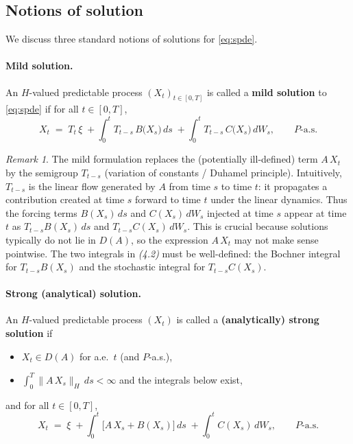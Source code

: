 \documentclass[11pt]{article}
\theoremstyle{definition}
\theoremstyle{remark}
\newtheorem{remark}{Remark}
\begin{document}
\subsection*{Notions of solution}

We discuss three standard notions of solutions for \eqref{eq:spde}.

\paragraph{Mild solution.}
An $H$-valued predictable process $(X_t)_{t\in[0,T]}$ is called a
\textbf{mild solution} to \eqref{eq:spde} if for all $t\in[0,T]$,
\begin{equation}\tag{4.2}
    X_t
    \;=\;
    T_t\,\xi
    \;+
    \int_0^t T_{t-s}\,B\bigl(X_s\bigr)\,ds
    \;+
    \int_0^t T_{t-s}\,C\bigl(X_s\bigr)\,dW_s,
    \qquad P\text{-a.s.}
\end{equation}

\begin{remark}
The mild formulation replaces the (potentially ill-defined) term $A\,X_t$ by
the semigroup $T_{t-s}$ (variation of constants / Duhamel principle).
Intuitively, $T_{t-s}$ is the linear flow generated by $A$ from time $s$ to time $t$:
it propagates a contribution created at time $s$ forward to time $t$ under the linear dynamics.
Thus the forcing terms $B(X_s)\,ds$ and $C(X_s)\,dW_s$ injected at time $s$ appear at time $t$
as $T_{t-s}B(X_s)\,ds$ and $T_{t-s}C(X_s)\,dW_s$.
This is crucial because solutions typically do not lie in $D(A)$,
so the expression $A\,X_t$ may not make sense pointwise.
The two integrals in \emph{(4.2)} must be well-defined: the Bochner integral
for $T_{t-s}B(X_s)$ and the stochastic integral for $T_{t-s}C(X_s)$.
\end{remark}

\paragraph{Strong (analytical) solution.}
An $H$-valued predictable process $(X_t)$ is called a
\textbf{(analytically) strong solution} if
\begin{itemize}
    \item $X_t \in D(A)$ for a.e.\ $t$ (and $P$-a.s.),
    \item $\int_0^T \|A\,X_s\|_H\,ds < \infty$ and the integrals below exist,
\end{itemize}
and for all $t\in[0,T]$,
\[
    X_t
    \;=\;
    \xi
    \;+
    \int_0^t \bigl[A\,X_s + B(X_s)\bigr] \,ds
    \;+
    \int_0^t C(X_s)\,dW_s,
    \qquad P\text{-a.s.}
\]
\end{document}
